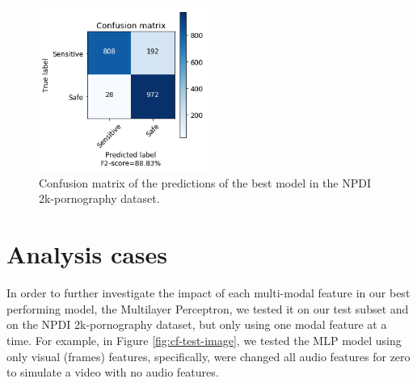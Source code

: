 \begin{figure}[!ht]
    \centering
    \includegraphics[width=0.49\textwidth]{img/results/MLP-2K-TEST.png}
    \caption{Confusion matrix of the predictions of the best model in the NPDI 2k-pornography dataset.}
    \label{fig:cf-test-2k}
\end{figure}

\section{Analysis cases}\label{sec:experiments-discussion}

In order to further investigate the impact of each multi-modal feature in our best performing model, the Multilayer Perceptron, we tested it on our test subset and on the NPDI 2k-pornography dataset, but only using one modal feature at a time. For example, in Figure \ref{fig:cf-test-image}, we tested the MLP model using only visual (frames) features, specifically, were changed all audio features for zero to simulate a video with no audio features.

